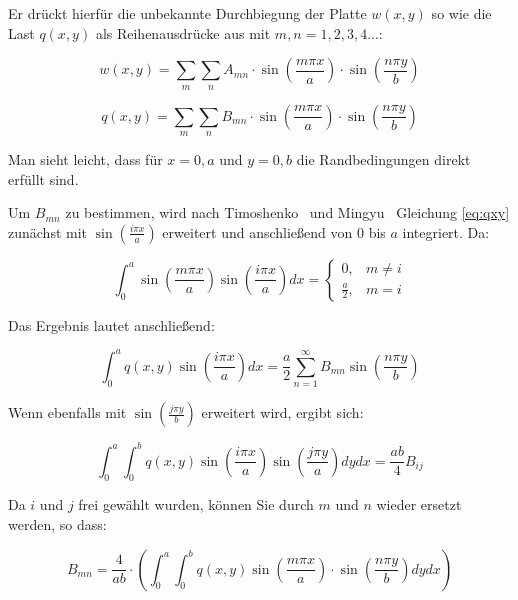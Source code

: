 Er drückt hierfür die unbekannte Durchbiegung der Platte $w(x,y)$ so wie die Last $q(x,y)$ als Reihenausdrücke aus mit $m,n = 1,2,3,4...$:

\begin{equation} 
w(x,y) = \sum_m \sum_n A_{mn} \cdot \sin\left(\dfrac{m \pi x}{a}\right) \cdot \sin\left(\dfrac{n \pi y}{b}\right)
\label{eq:wxy}
\end{equation} 

\begin{equation} 
q(x,y) = \sum_m \sum_n B_{mn} \cdot \sin\left(\dfrac{m \pi x}{a}\right) \cdot \sin\left(\dfrac{n \pi y}{b}\right)
\label{eq:qxy}
\end{equation} 

Man sieht leicht, dass für $x=0,a$ und $y=0,b$ die Randbedingungen direkt erfüllt sind.

Um $B_{mn}$ zu bestimmen, wird nach Timoshenko~\cite{Timoshenko.1922} und Mingyu~\cite{Mingyu.2019} Gleichung \ref{eq:qxy} zunächst mit $\sin{\left( \frac{i \pi x}{a}\right)}$ erweitert und anschließend von $0$ bis $a$ integriert. Da:

\begin{equation}
	\int_0^a \sin{\left( \frac{m \pi x}{a}\right)} \sin{\left( \frac{i \pi x}{a}\right)} dx = 
	\begin{cases}
	0,&  m\neq i\\
	\frac{a}{2},&   m = i 
	\end{cases}
\end{equation}

Das Ergebnis lautet anschließend:

\begin{equation}
	\int_0^a q(x,y) \sin{\left( \frac{i \pi x}{a}\right)} dx = \frac{a}{2} \sum_{n=1}^\infty B_{mn} \sin{\left( \frac{n \pi y}{b}\right)}
\end{equation}

Wenn ebenfalls mit $\sin{\left( \frac{j \pi y}{b}\right)}$ erweitert wird, ergibt sich:


\begin{equation}
\int_0^a \int_0^b q(x,y) \sin{\left( \frac{i \pi x}{a}\right)} \sin{\left( \frac{j \pi y}{a}\right)} dy dx = \frac{ab}{4}  B_{ij} 
\end{equation}


Da $i$ und $j$ frei gewählt wurden, können Sie durch $m$ und $n$ wieder ersetzt werden, so dass:


\begin{equation}
B_{mn} = \dfrac{4}{ab} \cdot \left( \int_0^a \int_0^b q(x,y) 
\sin\left(\dfrac{m \pi x}{a}\right) \cdot \sin\left( \dfrac{n \pi y}{b}\right) dy dx\right)
\label{eq:Bmn_allgemein}
\end{equation}

